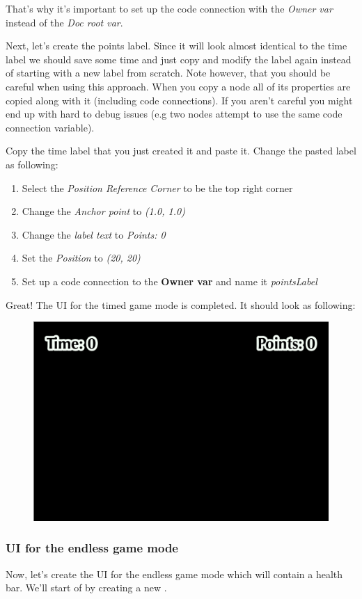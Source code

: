 That's why it's important to set up the code connection with the \textit{Owner var} instead of the \textit{Doc root var}.

Next, let's create the points label. Since it will look almost identical to the
time label we should save some time and just copy and modify the label again
instead of starting with a new label from scratch. Note however, that you should
be careful when using this approach. When you copy a node all of its
properties are copied along with it (including code connections). If you aren't
careful you might end up with hard to debug issues (e.g two nodes attempt to use
the same code connection variable).

\begin{leftbar}
Copy the time label that you just created it and paste it. Change the pasted
label as following:
\begin{enumerate}
  \item Select the \textit{Position Reference Corner} to be the top right corner
  \item Change the \textit{Anchor point} to \textit{(1.0, 1.0)}
  \item Change the \textit{label text} to \textit{Points: 0}
  \item Set the \textit{Position} to \textit{(20, 20)}
  \item Set up a code connection to the \textbf{Owner var} and name it \textit{pointsLabel}
\end{enumerate}
\end{leftbar}

Great! The UI for the timed game mode is completed. It should look as following:

\begin{figure}[H]
    \centering
    \includegraphics[width=0.5\linewidth]{images/Chapter7/timed_mode_ui.png}
\end{figure}

\subsubsection{UI for the endless game mode}
Now, let's create the  UI for the endless game mode which will contain a health
bar. We'll start of by creating a new \ccbfile{}.


